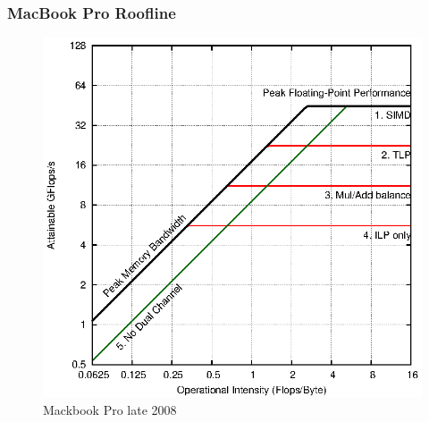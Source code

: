 \documentclass[a4paper,10pt,openright,openbib]{article}
\begin{document}
\subsubsection{MacBook Pro Roofline}
\begin{figure}[!htp]
	\centering
	\begin{minipage}[t]{0.5\linewidth}
		\includegraphics[width=\textwidth]{images/roofline_mbp.eps}
		\caption{Mackbook Pro late 2008 \label{fig:roofline1}}
	\end{minipage}
\end{figure}
\end{document}
